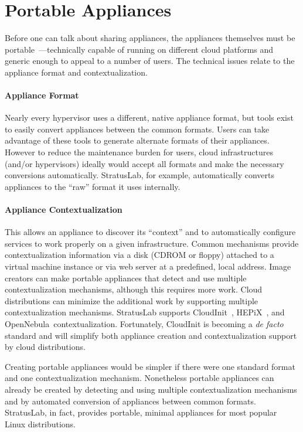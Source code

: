 \section{Portable Appliances}
\label{sec:portable-appliances}

Before one can talk about sharing appliances, the appliances
themselves must be portable~\cite{Petcu}---technically capable of
running on different cloud platforms and generic enough to appeal to a
number of users.  The technical issues relate to the appliance format
and contextualization.

\paragraph*{Appliance Format}
Nearly every hypervisor uses a different, native appliance format, but
tools exist to easily convert appliances between the common formats.
Users can take advantage of these tools to generate alternate formats
of their appliances.  However to reduce the maintenance burden for
users, cloud infrastructures (and/or hypervisors) ideally would accept
all formats and make the necessary conversions automatically.
StratusLab, for example, automatically converts appliances to the
``raw'' format it uses internally.

\paragraph*{Appliance Contextualization}
This allows an appliance to discover its ``context'' and to
automatically configure services to work properly on a given
infrastructure.  Common mechanisms provide contextualization
information via a disk (CDROM or floppy) attached to a virtual machine
instance or via web server at a predefined, local address.  Image
creators can make portable appliances that detect and use multiple
contextualization mechanisms, although this requires more work.  Cloud
distributions can minimize the additional work by supporting multiple
contextualization mechanisms.  StratusLab supports
CloudInit~\cite{cloudinit}, HEPiX~\cite{hepixbookcontext}, and
OpenNebula~\cite{opennebula}\@ contextualization.  Fortunately,
CloudInit is becoming a {\em de facto} standard and will simplify both
appliance creation and contextualization support by cloud
distributions.

Creating portable appliances would be simpler if there were one
standard format and one contextualization mechanism.  Nonetheless
portable appliances can already be created by detecting and using
multiple contextualization mechanisms and by automated conversion of
appliances between common formats.  StratusLab, in fact, provides
portable, minimal appliances for most popular Linux distributions.
